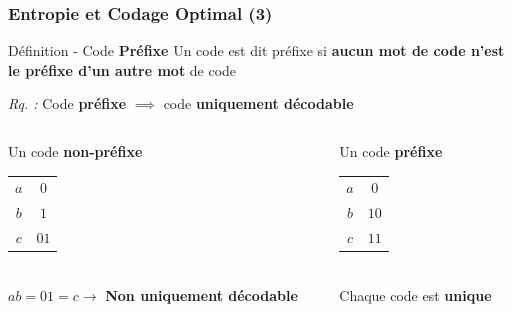 \documentclass[aspectratio=43]{beamer}
\begin{document}
\begin{frame}
    \frametitle{Entropie et Codage Optimal (3)}

    \begin{alertblock}{Définition - Code \bfseries Préfixe}
        Un code est dit préfixe si \textbf{aucun mot de code n'est le préfixe d'un autre mot} de code
    \end{alertblock}

    \textit{Rq. :} Code \textbf{préfixe} $\implies$ code \textbf{uniquement décodable}

    \vspace*{3em}

    \begin{columns}
        \begin{column}{0.5\textwidth}
            \centering 
            Un code \bfseries non-préfixe \\
            \begin{tabular}{c | c}
                \hline
                $a$ & $0$ \\
                $b$ & $1$ \\
                $c$ & $01$ \\ \hline
            \end{tabular} \\
        \vspace*{1em}
        $ab = 01 = c \rightarrow$ \textbf{\alert{Non} uniquement décodable}
        \end{column}

        \begin{column}{0.5\textwidth} %
            \centering
            Un code \textbf{préfixe} \\
            \begin{tabular}{c | c}
                \hline
                $a$ & $0$ \\
                $b$ & $10$ \\
                $c$ & $11$ \\ \hline
            \end{tabular} \\
            \vspace*{1em}
            Chaque code est \textbf{unique}
        \end{column}
    \end{columns}
\end{frame}
\end{document}

